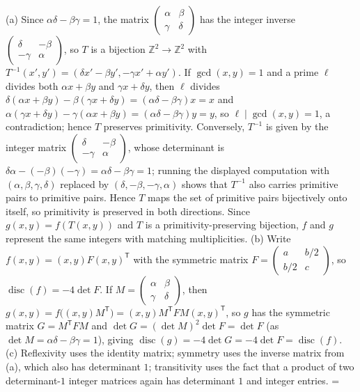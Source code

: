 \documentclass[11pt]{article}
\makeatletter
\let\nt@closedisplay\]
\def\nt@guardedclose{\@ifnextchar\par{\nt@closeafterpar}{\@ifnextchar\end{\postdisplaypenalty\@M\nt@closedisplay}{\nt@closedisplay}}}
\def\nt@closeafterpar\par{\@ifnextchar\par{\nt@closeafterpar}{\@ifnextchar\end{\postdisplaypenalty\@M\nt@closedisplay\par}{\nt@closedisplay\par}}}
\renewenvironment{proof}[1][\proofname]{\par
  \pushQED{\qed}\normalfont\topsep\medskipamount\edef\nt@afterproof{\@endparpenalty=\the\@endparpenalty\relax}\@beginparpenalty\@M\@endparpenalty\@M\let\]\nt@guardedclose\trivlist\item[]\textit{#1\@addpunct{.}} \ignorespaces}{\ifvmode\addpenalty\@M\fi\popQED\nt@afterproof\endtrivlist\@endpefalse}
\theoremstyle{ntstyle}
\DeclareMathOperator{\disc}{disc}
\makeatother
\begin{document}
\begin{proof} (a) Since $\alpha\delta-\beta\gamma=1$, the
  matrix $ \begin{pmatrix}\alpha & \beta \\\gamma&\delta \end{pmatrix}$ has the integer inverse
  $ \begin{pmatrix}\delta & -\beta \\-\gamma&\alpha \end{pmatrix}$, so $T$ is a bijection
  $\mathbb{Z}^2\to\mathbb{Z}^2$ with
  $T^{-1}(x',y')=(\delta x'-\beta y',-\gamma x'+\alpha y')$. If $\gcd(x, y)=1$ and a prime $\ell$ divides both
  $\alpha x+\beta y$ and $\gamma x+\delta y$, then $\ell$ divides
  $\delta(\alpha x+\beta y)-\beta(\gamma x+\delta y)=(\alpha\delta-\beta\gamma)x=x$ and
  $\alpha(\gamma x+\delta y)-\gamma(\alpha x+\beta y)=(\alpha\delta-\beta\gamma)y=y$, so
  $\ell\mid\gcd(x, y)=1$, a contradiction; hence $T$ preserves
  primitivity. Conversely, $T^{-1}$ is given by the integer matrix
  $\begin{pmatrix}\delta&-\beta\\-\gamma&\alpha\end{pmatrix}$, whose
  determinant is
  $\delta\alpha-(-\beta)(-\gamma)=\alpha\delta-\beta\gamma=1$; running
  the displayed computation with
  $(\alpha,\beta,\gamma,\delta)$ replaced by
  $(\delta,-\beta,-\gamma,\alpha)$ shows that $T^{-1}$ also carries
  primitive pairs to primitive pairs. Hence $T$ maps the set of
  primitive pairs bijectively onto itself, so primitivity is preserved
  in both directions. Since
  $g(x,y)=f(T(x,y))$ and $T$ is a primitivity-preserving bijection, $f$
  and $g$ represent the same integers with matching multiplicities.
  (b) Write $f(x,y)=(x,y)F(x,y)^{\mathsf{T}}$ with the symmetric matrix
  $F= \begin{pmatrix}a & b/2 \\b/2&c \end{pmatrix}$, so $\disc(f)=-4\det F$. If
  $M= \begin{pmatrix}\alpha & \beta \\\gamma&\delta \end{pmatrix}$, then
  $g(x,y)=f\big((x,y)M^{\mathsf{T}}\big)=(x,y)M^{\mathsf{T}} F M(x,y)^{\mathsf{T}}$, so $g$ has the symmetric
  matrix $G=M^{\mathsf{T}}FM$ and $\det G=(\det M)^2\det F=\det F$ (as $\det M=\alpha\delta-\beta\gamma=1$), giving
  $\disc(g)=-4\det G=-4\det F=\disc(f)$.
  (c) Reflexivity uses the identity matrix; symmetry uses the inverse
  matrix from (a), which also has determinant $1$; transitivity uses
  the fact that a product of two determinant-$1$ integer matrices again has
  determinant $1$ and integer entries.
\end{proof}
\end{document}
